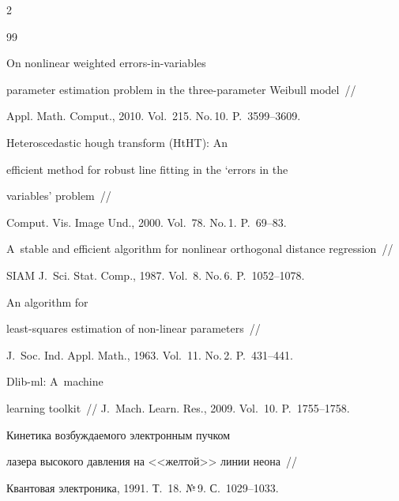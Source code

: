 \begin{multicols}{2}
{{\begin{thebibliography}{99}


On nonlinear weighted errors-in-variables

  parameter estimation problem in the three-parameter Weibull model~//

{Appl. Math. Comput.}, 2010. Vol.~215. No.\,10. P.~3599--3609.





Heteroscedastic hough transform (HtHT): An

  efficient method for robust line fitting in the `errors in the

  variables' problem~//

{Comput. Vis. Image Und.}, 2000. Vol.~78. No.\,1. P.~69--83.





A~stable and efficient algorithm for nonlinear orthogonal distance regression~//

{SIAM J.~Sci. Stat.  Comp.},   1987. Vol.~8. No.\,6. P.~1052--1078.




  An algorithm for

  least-squares estimation of non-linear parameters~//

{J.~Soc. Ind. Appl.   Math.}, 1963. Vol.~11. No.\,2. P.~431--441.




  Dlib-ml: A~machine

learning toolkit~// {J.~Mach. Learn. Res.}, 2009. Vol.~10. P.~1755--1758.




 Кинетика возбуждаемого электронным пучком 

лазера высокого давления на <<желтой>> линии неона~//

Квантовая электроника, 1991. Т.~18. №\,9. С.~1029--1033.




\end{thebibliography}}}
\end{multicols}
